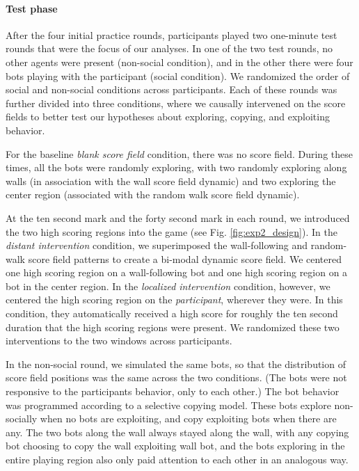 \documentclass[12pt,letterpaper]{article}
\begin{document}
\paragraph{Test phase}

After the four initial practice rounds, participants played two one-minute test rounds that were the focus of our analyses. 
In one of the two test rounds, no other agents were present (non-social condition), and in the other there were four bots playing with the participant (social condition). 
We randomized the order of social and non-social conditions across participants. 
Each of these rounds was further divided into three conditions, where we causally intervened on the score fields to better test our hypotheses about exploring, copying, and exploiting behavior. 

For the baseline \textit{blank score field} condition, there was no score field. During these times, all the bots were randomly exploring, with two randomly exploring along walls (in association with the wall score field dynamic) and two exploring the center region (associated with the random walk score field dynamic). 

At the ten second mark and the forty second mark in each round, we introduced the two high scoring regions into the game (see Fig. \ref{fig:exp2_design}).
In the \textit{distant intervention} condition, we superimposed the wall-following and random-walk score field patterns to create a bi-modal dynamic score field. 
We centered one high scoring region on a wall-following bot and one high scoring region on a bot in the center region. 
In the \textit{localized intervention} condition, however, we centered the high scoring region on the \emph{participant}, wherever they were. In this condition, they automatically received a high score for roughly the ten second duration that the high scoring regions were present.
We randomized these two interventions to the two windows across participants. 

In the non-social round, we simulated the same bots, so that the distribution of score field positions was the same across the two conditions. (The bots were not responsive to the participants behavior, only to each other.) The bot behavior was programmed according to a selective copying model. These bots explore non-socially when no bots are exploiting, and copy exploiting bots when there are any. The two bots along the wall always stayed along the wall, with any copying bot choosing to copy the wall exploiting wall bot, and the bots exploring in the entire playing region also only paid attention to each other in an analogous way.
\end{document}
